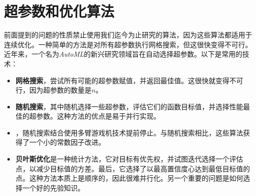 \section{
	超参数和优化算法
	}

前面提到的问题的性质禁止使用我们迄今为止研究的算法，因为这些算法都适用于连续优化。一种简单的方法是对所有超参数执行网格搜索，但这很快变得不可行。
近年来，一个名为\emph{AutoML}的新兴研究领域旨在自动选择超参数。以下是常用的技术：

\begin{itemize}
	\setlength{\itemsep}{0pt}
	\item 
	{\bf 网格搜索}，尝试所有可能的超参数赋值，并返回最佳值。这很快就变得不可行，因为超参数的数量是$n$。
	\item 
	{\bf 随机搜索}，其中随机选择一些超参数，评估它们的函数目标值，并选择性能最佳的超参数。这种方法的优点是易于并行实现。
	\item 
	{}，随机搜索结合使用多臂游戏机技术提前停止。与随机搜索相比，这些算法获得了一个小的常数因子改进。
	\item 
	{\bf 贝叶斯优化}是一种统计方法，它对目标有优先权，并试图迭代选择一个评估点，以减少目标值的方差。最后，它选择了以最高置信度心达到最低目标值的点。这种方法本质上是顺序的，因此很难并行化。另一个重要的问题是如何选择一个好的先验知识。
\end{itemize}

